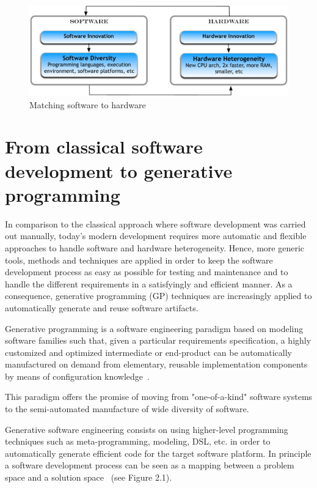 \begin{figure}[h]
	\center
	\includegraphics[scale=0.65]{Background/fig/marriage}
	\caption{Matching software to hardware}
\end{figure}

\section{From classical software development to generative programming}
\label{sec:FROM} 
In comparison to the classical approach where software development was carried out manually, today’s modern development requires more automatic and flexible approaches to handle software and hardware heterogeneity.
Hence, more generic tools, methods and techniques are applied in order to keep the software development process as easy as possible for testing and maintenance and to handle the different requirements in a satisfyingly and efficient manner.
As a consequence, generative programming (GP) techniques are increasingly applied to automatically generate and reuse software artifacts.
\begin{mydef}
		Generative programming is a software engineering paradigm based on modeling software families such that, given a particular requirements specification, a highly customized and optimized intermediate or end-product can be automatically manufactured on demand from elementary, reusable implementation components by means of configuration knowledge~\cite{Czarnecki:2000:GPM:345203}.
\end{mydef}

This paradigm offers the promise of moving from "one-of-a-kind" software systems to the semi-automated manufacture of wide diversity of software.

Generative software engineering consists on using higher-level programming techniques such as meta-programming, modeling, DSL, etc. in order to automatically generate efficient code for the target software platform. 
In principle a software development process can be seen as a mapping between a problem space and a solution space~\cite{czarnecki2005overview} (see Figure 2.1). 

